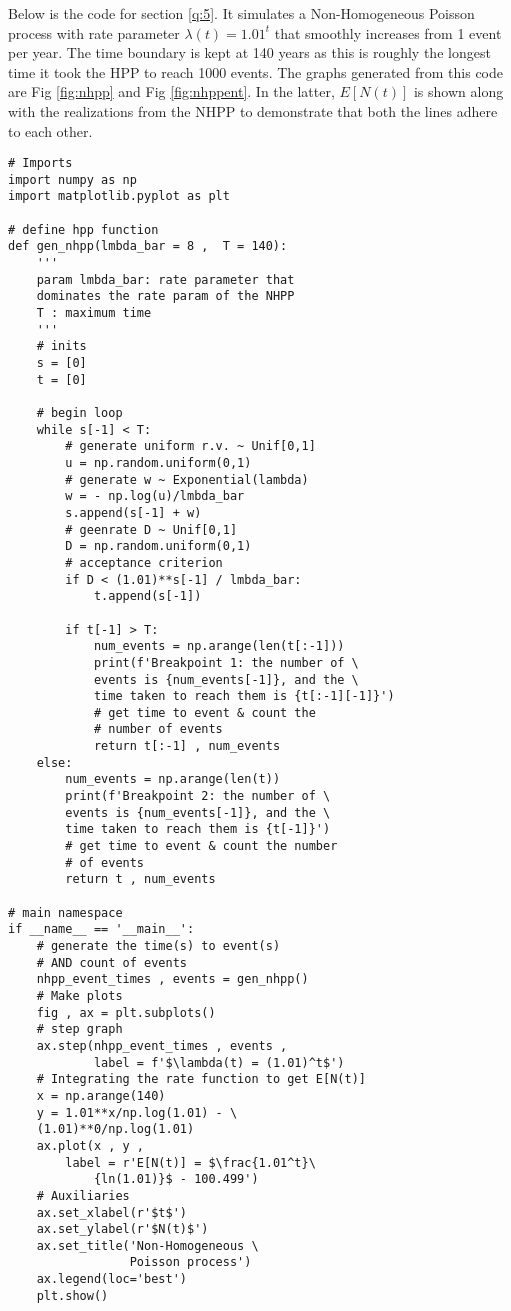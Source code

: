 \documentclass[%
 reprint,
 amsmath,amssymb,
 aps,
]{revtex4-2}
\theoremstyle{definition}
\begin{document}
Below is the code for section \ref{q:5}. It simulates a Non-Homogeneous Poisson process with rate parameter $\lambda(t)=1.01^t$ that smoothly increases from 1 event per year. The time boundary is kept at 140 years as this is roughly the longest time it took the HPP to reach 1000 events. The graphs generated from this code are Fig \ref{fig:nhpp} and Fig \ref{fig:nhppent}. In the latter, $E[N(t)]$ is shown along with the realizations from the NHPP to demonstrate	 that both the lines adhere to each other.
\begin{verbatim}
# Imports
import numpy as np
import matplotlib.pyplot as plt

# define hpp function
def gen_nhpp(lmbda_bar = 8 ,  T = 140):
    '''
    param lmbda_bar: rate parameter that 
    dominates the rate param of the NHPP
    T : maximum time
    '''
    # inits
    s = [0]
    t = [0]

    # begin loop
    while s[-1] < T:
        # generate uniform r.v. ~ Unif[0,1]
        u = np.random.uniform(0,1)
        # generate w ~ Exponential(lambda) 
        w = - np.log(u)/lmbda_bar 
        s.append(s[-1] + w)
        # geenrate D ~ Unif[0,1]
        D = np.random.uniform(0,1)
        # acceptance criterion
        if D < (1.01)**s[-1] / lmbda_bar:
            t.append(s[-1])
        
        if t[-1] > T:
            num_events = np.arange(len(t[:-1]))
            print(f'Breakpoint 1: the number of \
            events is {num_events[-1]}, and the \
            time taken to reach them is {t[:-1][-1]}')
            # get time to event & count the 
            # number of events
            return t[:-1] , num_events
    else:
        num_events = np.arange(len(t))
        print(f'Breakpoint 2: the number of \
        events is {num_events[-1]}, and the \
        time taken to reach them is {t[-1]}')
        # get time to event & count the number 
        # of events
        return t , num_events

# main namespace
if __name__ == '__main__': 
    # generate the time(s) to event(s) 
    # AND count of events
    nhpp_event_times , events = gen_nhpp() 
    # Make plots
    fig , ax = plt.subplots()
    # step graph
    ax.step(nhpp_event_times , events , 
            label = f'$\lambda(t) = (1.01)^t$') 
    # Integrating the rate function to get E[N(t)]
    x = np.arange(140)
    y = 1.01**x/np.log(1.01) - \
    (1.01)**0/np.log(1.01)
    ax.plot(x , y , 
    	label = r'E[N(t)] = $\frac{1.01^t}\
            {ln(1.01)}$ - 100.499')
    # Auxiliaries
    ax.set_xlabel(r'$t$')
    ax.set_ylabel(r'$N(t)$')
    ax.set_title('Non-Homogeneous \
                 Poisson process')
    ax.legend(loc='best')
    plt.show()

\end{verbatim}

\nocite{*}

\end{document}

